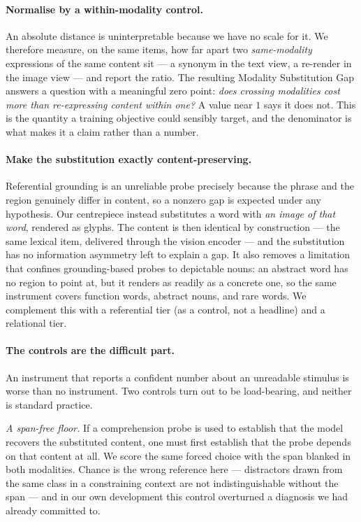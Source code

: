 \paragraph{Normalise by a within-modality control.}
An absolute distance is uninterpretable because we have no scale for it. We
therefore measure, on the same items, how far apart two \emph{same-modality}
expressions of the same content sit --- a synonym in the text view, a re-render
in the image view --- and report the ratio. The resulting Modality Substitution
Gap answers a question with a meaningful zero point: \emph{does crossing
modalities cost more than re-expressing content within one?} A value near $1$
says it does not. This is the quantity a training objective could sensibly
target, and the denominator is what makes it a claim rather than a number.

\paragraph{Make the substitution exactly content-preserving.}
Referential grounding is an unreliable probe precisely because the phrase and
the region genuinely differ in content, so a nonzero gap is expected under any
hypothesis. Our centrepiece instead substitutes a word with \emph{an image of
that word}, rendered as glyphs. The content is then identical by construction ---
the same lexical item, delivered through the vision encoder --- and the
substitution has no information asymmetry left to explain a gap. It also removes
a limitation that confines grounding-based probes to depictable nouns: an
abstract word has no region to point at, but it renders as readily as a concrete
one, so the same instrument covers function words, abstract nouns, and rare
words. We complement this with a referential tier (as a control, not a headline)
and a relational tier.

\paragraph{The controls are the difficult part.}
An instrument that reports a confident number about an unreadable stimulus is
worse than no instrument. Two controls turn out to be load-bearing, and neither
is standard practice.

\emph{A span-free floor.} If a comprehension probe is used to establish that the
model recovers the substituted content, one must first establish that the probe
depends on that content at all. We score the same forced choice with the span
blanked in both modalities. Chance is the wrong reference here --- distractors
drawn from the same class in a constraining context are not indistinguishable
without the span --- and in our own development this control overturned a
diagnosis we had already committed to.


